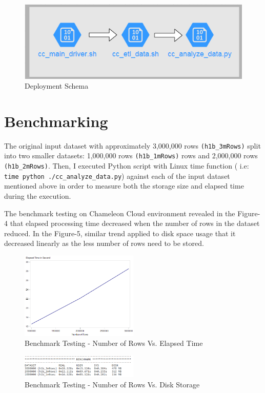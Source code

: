 \documentclass[9pt,twocolumn,twoside]{../../styles/osajnl}
\begin{document}
\begin{figure}[H]
 \centering
\includegraphics[scale=0.6]{images/image22}
\caption{Deployment Schema}
\end{figure}

\section{Benchmarking}
 The original input dataset with approximately 3,000,000 rows \verb|(h1b_3mRows)| split into two smaller datasets: 1,000,000 rows \verb|(h1b_1mRows)| rows and 2,000,000 rows \verb|(h1b_2mRows)|. Then, I  executed Python script with Linux time function ( i.e:  \verb|time python ./cc_analyze_data.py|)  against each of the input dataset mentioned above in order to measure both the storage size and elapsed time during the execution. 
 
 The benchmark testing on Chameleon Cloud environment revealed in the Figure-4 that elapsed processing time decreased  when the number of rows in the dataset reduced. In the Figure-5, similar trend applied to disk space usage that it decreased linearly  as  the less number of rows need to be stored.


\begin{figure}[H]
  \centering
  \includegraphics[width=0.5\textwidth]{images/image21}     
  \caption{Benchmark Testing - Number of Rows Vs. Elapsed Time}
  \end{figure}
  
  \begin{figure}[H]
  \centering
  \includegraphics[width=0.5\textwidth]{images/image20}     
  \caption{Benchmark Testing - Number of Rows Vs. Disk Storage }
  \end{figure}
\end{document}

